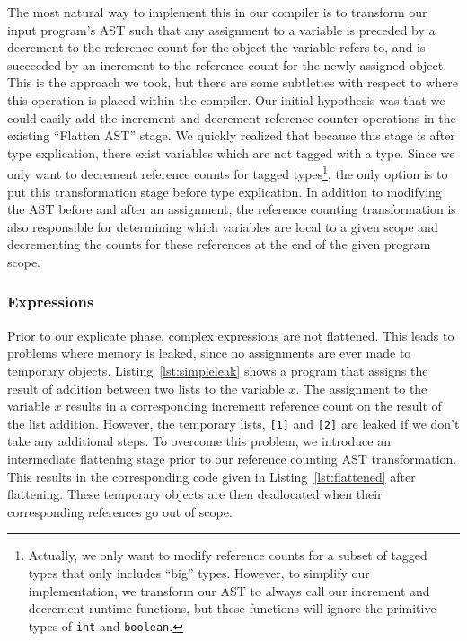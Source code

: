 \documentclass{sigplanconf}
\newcommand{\avariable}[1]{\ensuremath{#1}}
\newcommand{\aliteral}[1]{\texttt{#1}}
\newcommand{\atype}[1]{\texttt{#1}}
\begin{document}
The most natural way to implement this in our compiler is to transform our input program's AST such that any assignment to a variable is preceded by a decrement to the reference count for the object the variable refers to, and is succeeded by an increment to the reference count for the newly assigned object.  This is the approach we took, but there are some subtleties with respect to where this operation is placed within the compiler.  Our initial hypothesis was that we could easily add the increment and decrement reference counter operations in the existing ``Flatten AST'' stage.  We quickly realized that because this stage is after type explication, there exist variables which are not tagged with a type.  Since we only want to decrement reference counts for tagged types\footnote{Actually, we only want to modify reference counts for a subset of tagged types that only includes ``big'' types. However, to simplify our implementation, we transform our AST to always call our increment and decrement runtime functions, but these functions will ignore the primitive types of \atype{int} and \atype{boolean}.}, the only option is to put this transformation stage before type explication.  In addition to modifying the AST before and after an assignment, the reference counting transformation is also responsible for determining which variables are local to a given scope and decrementing the counts for these references at the end of the given program scope.

\subsubsection{Expressions}
Prior to our explicate phase, complex expressions are not flattened.  This leads to problems where memory is leaked, since no assignments are ever made to temporary objects.  Listing~\ref{lst:simpleleak} shows a program that assigns the result of addition between two lists to the variable \avariable{x}.  The assignment to the variable \avariable{x} results in a corresponding increment reference count on the result of the list addition.  However, the temporary lists, \aliteral{[1]} and \aliteral{[2]} are leaked if we don't take any additional steps.  To overcome this problem, we introduce an intermediate flattening stage prior to our reference counting AST transformation.   This results in the corresponding code given in Listing~\ref{lst:flattened} after flattening.  These temporary objects are then deallocated when their corresponding references go out of scope.
\end{document}
